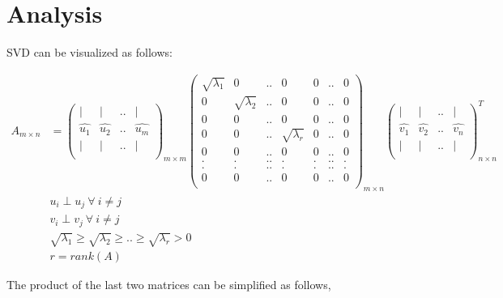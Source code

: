 \documentclass[11pt, a4paper]{article}
\begin{document}
\section{Analysis}

SVD can be visualized as follows:

\begin{align*}
	A_{m \times n} &= \begin{pmatrix}
	| & | & .. & | \\
	\hat{u_1} & \hat{u_2} & .. & \hat{u_m} \\
	| & | & .. & | \\        
	\end{pmatrix}_{m \times m} \begin{pmatrix}
	\sqrt{\lambda_1} & 0                & .. & 0                & 0 & .. & 0 \\
	0                & \sqrt{\lambda_2} & .. & 0                & 0 & .. & 0 \\
	0                & 0                & .. & 0                & 0 & .. & 0 \\
	0                & 0                & .. & \sqrt{\lambda_r} & 0 & .. & 0 \\ 
	0                & 0                & .. & 0                & 0 & .. & 0 \\ 
	.                & .                & .. & .                & . & .. & . \\
	.                & .                & .. & .                & . & .. & . \\       
	0                & 0                & .. & 0                & 0 & .. & 0 \\        
	\end{pmatrix}_{m \times n} \begin{pmatrix}
	| & | & .. & | \\
	\hat{v_1} & \hat{v_2} & .. & \hat{v_n} \\
	| & | & .. & | \\        
	\end{pmatrix}_{n \times n}^T \\
	&u_i \perp u_j\ \forall\ i \neq j \\
	&v_i \perp v_j\ \forall\ i \neq j \\
	&\sqrt{\lambda_1} \geq \sqrt{\lambda_2} \geq .. \geq \sqrt{\lambda_r} > 0 \\ 
	&r = rank(A)    
\end{align*}

The product of the last two matrices can be simplified as follows,
\end{document}
